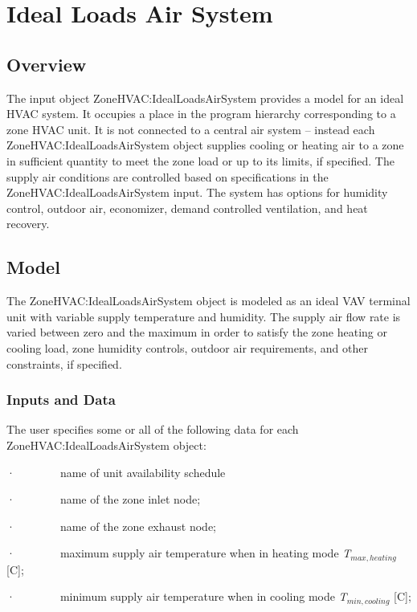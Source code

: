 \section{Ideal Loads Air System }\label{ideal-loads-air-system}

\subsection{Overview}\label{overview-021}

The input object ZoneHVAC:IdealLoadsAirSystem provides a model for an ideal HVAC system. It occupies a place in the program hierarchy corresponding to a zone HVAC unit. It is not connected to a central air system -- instead each ZoneHVAC:IdealLoadsAirSystem object supplies cooling or heating air to a zone in sufficient quantity to meet the zone load or up to its limits, if specified. The supply air conditions are controlled based on specifications in the ZoneHVAC:IdealLoadsAirSystem input. The system has options for humidity control, outdoor air, economizer, demand controlled ventilation, and heat recovery.

\subsection{Model}\label{model-002}

The ZoneHVAC:IdealLoadsAirSystem object is modeled as an ideal VAV terminal unit with variable supply temperature and humidity. The supply air flow rate is varied between zero and the maximum in order to satisfy the zone heating or cooling load, zone humidity controls, outdoor air requirements, and other constraints, if specified.

\subsubsection{Inputs and Data}\label{inputs-and-data-002}

The user specifies some or all of the following data for each ZoneHVAC:IdealLoadsAirSystem object:

·~~~~~~~~name of unit availability schedule

·~~~~~~~~name of the zone inlet node;

·~~~~~~~~name of the zone exhaust node;

·~~~~~~~~maximum supply air temperature when in heating mode \emph{T\(_{max,heating}\)} {[}C{]};

·~~~~~~~~minimum supply air temperature when in cooling mode \emph{T\(_{min,cooling}\)} {[}C{]};

